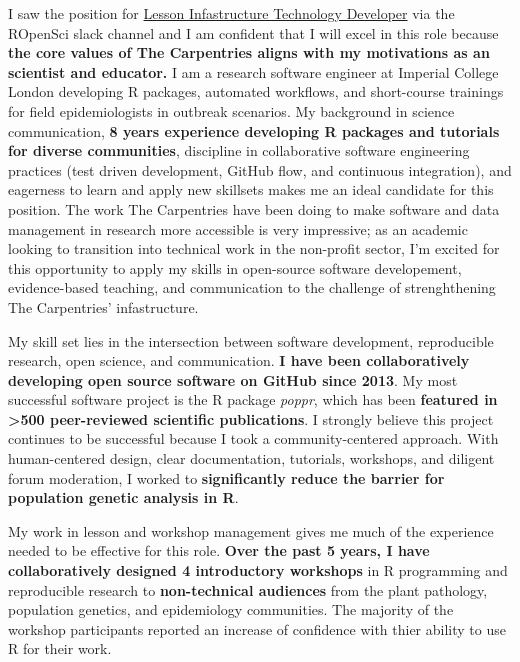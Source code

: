 I saw the position for
\href{https://static.carpentries.org/lesson-infrastructure-technology-developer/}{Lesson
Infastructure Technology Developer} via the ROpenSci slack channel and %
I am confident that I will excel in this role because \textbf{the core values of The
Carpentries aligns with my motivations as an scientist and educator.}
I am a research software engineer at Imperial College London developing R
packages, automated workflows, and short-course trainings for field
epidemiologists in outbreak scenarios. My background in science communication,
\textbf{8 years experience developing R packages and tutorials for diverse
communities}, discipline in collaborative software engineering practices (test
driven development, GitHub flow, and continuous integration), and eagerness to
learn and apply new skillsets makes me an ideal candidate for this position.
The work The Carpentries have been doing to make software and data management
in research more accessible is very impressive; as an academic looking to
transition into technical work in the non-profit sector, I'm excited for this
opportunity to apply my skills in open-source software developement,
evidence-based teaching, and communication to the challenge of strenghthening
The Carpentries' infastructure. 

\vspace{1ex}

My skill set lies in the intersection between software development,
reproducible research, open science, and communication.  \textbf{I have been
collaboratively developing open source software on GitHub
since 2013}. My most successful software project is the R package
\textit{poppr}, which has been \textbf{featured in \textgreater500
peer-reviewed scientific publications}. I strongly believe this project 
continues to be successful because I took a community-centered approach. With
human-centered design, clear documentation, tutorials, workshops, and diligent
forum moderation, I worked to \textbf{significantly reduce the barrier
for population genetic analysis in R}.

\vspace{1ex}

My work in lesson and workshop management gives me much of the experience
needed to be effective for this role. \textbf{Over the past 5 years, I have
collaboratively designed 4 introductory workshops} in R programming and
reproducible research to \textbf{non-technical audiences} from the
plant pathology, population genetics, and epidemiology communities. The
majority of the workshop participants reported an increase of confidence with
thier ability to use R for their work.

